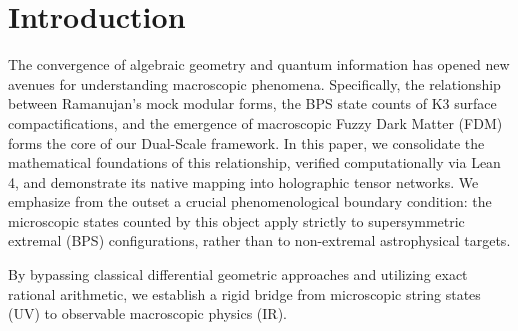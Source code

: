\section{Introduction}

The convergence of algebraic geometry and quantum information has opened new avenues for understanding macroscopic phenomena. Specifically, the relationship between Ramanujan's mock modular forms, the BPS state counts of K3 surface compactifications, and the emergence of macroscopic Fuzzy Dark Matter (FDM) forms the core of our Dual-Scale framework. In this paper, we consolidate the mathematical foundations of this relationship, verified computationally via Lean 4, and demonstrate its native mapping into holographic tensor networks. We emphasize from the outset a crucial phenomenological boundary condition: the microscopic states counted by this object apply strictly to supersymmetric extremal (BPS) configurations, rather than to non-extremal astrophysical targets.

By bypassing classical differential geometric approaches and utilizing exact rational arithmetic, we establish a rigid bridge from microscopic string states (UV) to observable macroscopic physics (IR).
